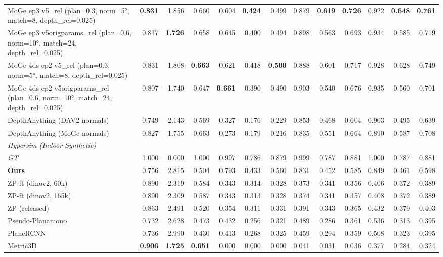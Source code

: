 \begin{table}[H]
{\begin{tabular}{l r r r r r r r r r r r r}
MoGe ep3 v5\_rel (plan=0.3, norm=5°, match=8, depth\_rel=0.025) & \textbf{0.831} & 1.856 & 0.660 & 0.604 & \textbf{0.424} & 0.499 & 0.879 & \textbf{0.619} & \textbf{0.726} & 0.922 & \textbf{0.648} & \textbf{0.761} \\
MoGe ep3 v5origparams\_rel (plan=0.6, norm=10°, match=24, depth\_rel=0.025) & 0.817 & \textbf{1.726} & 0.658 & 0.645 & 0.400 & 0.494 & 0.898 & 0.563 & 0.693 & 0.934 & 0.585 & 0.719 \\
MoGe 4ds ep2 v5\_rel (plan=0.3, norm=5°, match=8, depth\_rel=0.025) & 0.831 & 1.808 & \textbf{0.663} & 0.621 & 0.418 & \textbf{0.500} & 0.888 & 0.601 & 0.717 & 0.928 & 0.628 & 0.749 \\
MoGe 4ds ep2 v5origparams\_rel (plan=0.6, norm=10°, match=24, depth\_rel=0.025) & 0.807 & 1.740 & 0.647 & \textbf{0.661} & 0.390 & 0.490 & 0.903 & 0.540 & 0.676 & 0.935 & 0.560 & 0.701 \\
DepthAnything (DAV2 normals) & 0.749 & 2.143 & 0.569 & 0.327 & 0.176 & 0.229 & 0.853 & 0.468 & 0.604 & 0.903 & 0.495 & 0.639 \\
DepthAnything (MoGe normals) & 0.827 & 1.755 & 0.663 & 0.273 & 0.179 & 0.216 & 0.835 & 0.551 & 0.664 & 0.890 & 0.587 & 0.708 \\
\midrule
\multicolumn{13}{l}{\textit{Hypersim (Indoor Synthetic)}} \\
\midrule
\textit{GT} & 1.000 & 0.000 & 1.000 & 0.997 & 0.786 & 0.879 & 0.999 & 0.787 & 0.881 & 1.000 & 0.787 & 0.881 \\
\textbf{Ours} & 0.756 & 2.815 & 0.504 & 0.793 & 0.433 & 0.560 & 0.831 & 0.452 & 0.585 & 0.849 & 0.461 & 0.598 \\
ZP-ft (dinov2, 60k) & 0.890 & 2.319 & 0.584 & 0.343 & 0.314 & 0.328 & 0.373 & 0.341 & 0.356 & 0.406 & 0.372 & 0.389 \\
ZP-ft (dinov2, 165k) & 0.890 & 2.309 & 0.587 & 0.343 & 0.313 & 0.328 & 0.374 & 0.341 & 0.357 & 0.408 & 0.372 & 0.389 \\
ZP (released) & 0.863 & 2.491 & 0.520 & 0.354 & 0.311 & 0.331 & 0.391 & 0.343 & 0.365 & 0.432 & 0.379 & 0.403 \\
Pseudo-Planamono & 0.732 & 2.628 & 0.473 & 0.432 & 0.256 & 0.321 & 0.489 & 0.286 & 0.361 & 0.536 & 0.313 & 0.395 \\
PlaneRCNN & 0.736 & 2.990 & 0.430 & 0.413 & 0.268 & 0.325 & 0.459 & 0.294 & 0.359 & 0.508 & 0.323 & 0.395 \\
Metric3D & \textbf{0.906} & \textbf{1.725} & \textbf{0.651} & 0.000 & 0.000 & 0.000 & 0.041 & 0.031 & 0.036 & 0.377 & 0.284 & 0.324 \\

\end{tabular}}
\end{table}
